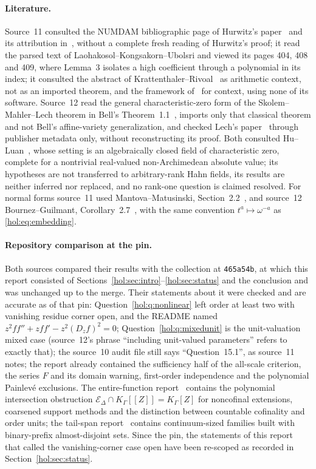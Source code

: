 \documentclass[11pt]{article}
\numberwithin{equation}{section}
\theoremstyle{definition}
\theoremstyle{remark}
\begin{document}
\paragraph{Literature.}
Source~11 consulted the NUMDAM bibliographic page of Hurwitz's
paper~\cite{hurwitz} and its attribution in~\cite{lku}, without a complete
fresh reading of Hurwitz's proof; it read the parsed text of
Laohakosol--Kongsakorn--Ubolsri and viewed its pages 404, 408 and 409, where
Lemma~3 isolates a high coefficient through a polynomial in its index; it
consulted the abstract of Krattenthaler--Rivoal~\cite{kr} as arithmetic
context, not as an imported theorem, and the framework
of~\cite{ast} for context, using none of its software. Source~12 read the
general characteristic-zero form of the Skolem--Mahler--Lech theorem in Bell's
Theorem~1.1~\cite{bell}, imports only that classical theorem and not Bell's
affine-variety generalization, and checked Lech's paper~\cite{lech} through
publisher metadata only, without reconstructing its proof. Both consulted
Hu--Luan~\cite{huluan}, whose setting is an algebraically closed field
of characteristic zero, complete for a nontrivial real-valued non-Archimedean
absolute value; its hypotheses are not transferred to arbitrary-rank Hahn fields, its results are
neither inferred nor replaced, and no rank-one question is claimed resolved.
For normal forms source~11 used Mantova--Matusinski, Section~2.2~\cite{mantovamatusinski},
and source~12 Bournez--Guilmant, Corollary~2.7~\cite{bgexp}, with the same
convention $t^a\mapsto\omega^{-a}$ as \eqref{hol:eq:embedding}.

\paragraph{Repository comparison at the pin.}
Both sources compared their results with the collection at
\texttt{465a54b}, at which this report consisted of
Sections~\ref{hol:sec:intro}--\ref{hol:sec:status} and the conclusion and was
unchanged up to the merge. Their statements about it were checked and are
accurate as of that pin: Question~\ref{hol:q:nonlinear} left order at least two
with vanishing residue corner open, and the README named
$z^2ff''+zff'-z^2(D_zf)^2=0$; Question~\ref{hol:q:mixedunit} is the
unit-valuation mixed case (source~12's phrase ``including unit-valued
parameters'' refers to exactly that); the source~10 audit file still says
``Question~15.1'', as source~11 notes; the report already contained the
sufficiency half of the all-scale criterion, the series $F$ and its domain
warning, first-order independence and the polynomial Painlev\'e exclusions.
The entire-function report~\cite{repoentire} contains the polynomial
intersection obstruction $\mathcal E_\Delta\cap K_\Gamma[[Z]]=K_\Gamma[Z]$ for
noncofinal extensions, coarsened support methods and the distinction between
countable cofinality and order units; the tail-span report~\cite{repotail}
contains continuum-sized families built with binary-prefix almost-disjoint
sets. Since the pin, the statements of this report that called the
vanishing-corner case open have been re-scoped as recorded in
Section~\ref{hol:sec:status}.
\end{document}

